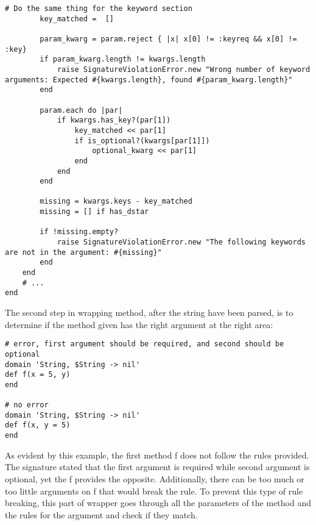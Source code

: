 \begin{lstlisting}[caption={Wrapper method: check if the method has correct argument(s)}]
        # Do the same thing for the keyword section
        key_matched =  []

        param_kwarg = param.reject { |x| x[0] != :keyreq && x[0] != :key}
        if param_kwarg.length != kwargs.length
            raise SignatureViolationError.new "Wrong number of keyword arguments: Expected #{kwargs.length}, found #{param_kwarg.length}"
        end
                
        param.each do |par|
            if kwargs.has_key?(par[1])
                key_matched << par[1]
                if is_optional?(kwargs[par[1]])
                    optional_kwarg << par[1]
                end
            end
        end

        missing = kwargs.keys - key_matched
        missing = [] if has_dstar

        if !missing.empty?
            raise SignatureViolationError.new "The following keywords are not in the argument: #{missing}"
        end
    end
    # ...
end
\end{lstlisting}

The second step in wrapping method, after the string have been parsed,  is to determine if the method given has the right argument at the right area:

\begin{lstlisting}[caption={Example: wrapper method}]
# error, first argument should be required, and second should be optional
domain 'String, $String -> nil'
def f(x = 5, y)
end

# no error
domain 'String, $String -> nil'
def f(x, y = 5)
end
\end{lstlisting}

As evident by this example, the first method f does not follow the rules provided.  The signature stated that the first argument is required while second argument is optional, yet the f provides the opposite.  Additionally, there can be too much or too little arguments on f that would break the rule.  To prevent this type of rule breaking, this part of wrapper goes through all the parameters of the method and the rules for the argument and check if they match.

